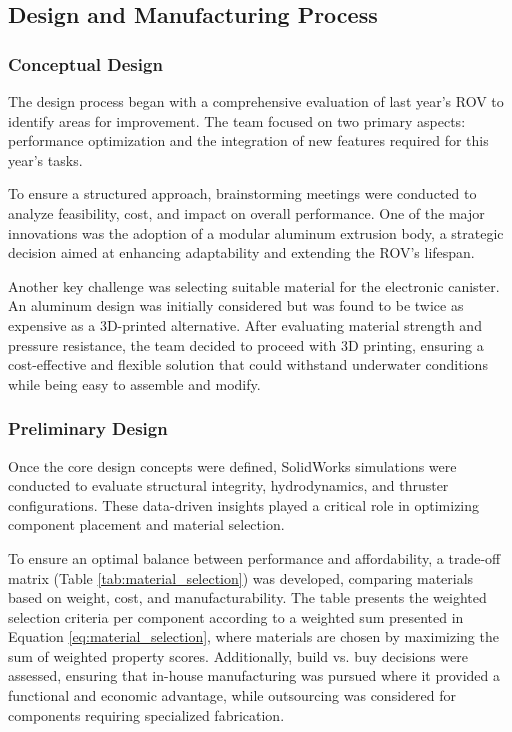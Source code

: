 \vspace{0.2cm}
\subsection{Design and Manufacturing Process}

\subsubsection{Conceptual Design}

The design process began with a comprehensive evaluation of last year’s ROV to identify areas for improvement. The team focused on two primary aspects: performance optimization and the integration of new features required for this year’s tasks.

To ensure a structured approach, brainstorming meetings were conducted to analyze feasibility, cost, and impact on overall performance. One of the major innovations was the adoption of a modular aluminum extrusion body, a strategic decision aimed at enhancing adaptability and extending the ROV’s lifespan. 

\hspace{10pt} Another key challenge was selecting suitable material for the electronic canister. An aluminum design was initially considered but was found to be twice as expensive as a 3D-printed alternative. After evaluating material strength and pressure resistance, the team decided to proceed with 3D printing, ensuring a cost-effective and flexible solution that could withstand underwater conditions while being easy to assemble and modify.

\subsubsection{Preliminary Design}

Once the core design concepts were defined, SolidWorks simulations were conducted to evaluate structural integrity, hydrodynamics, and thruster configurations. These data-driven insights played a critical role in optimizing component placement and material selection.

\hspace{10pt} To ensure an optimal balance between performance and affordability, a trade-off matrix (Table \ref{tab:material_selection}) was developed, comparing materials based on weight, cost, and manufacturability. The table presents the weighted selection criteria per component according to  a weighted sum presented in Equation \ref{eq:material_selection}, where materials are chosen by maximizing the sum of weighted property scores. Additionally, build vs. buy decisions were assessed, ensuring that in-house manufacturing was pursued where it provided a functional and economic advantage, while outsourcing was considered for components requiring specialized fabrication.

